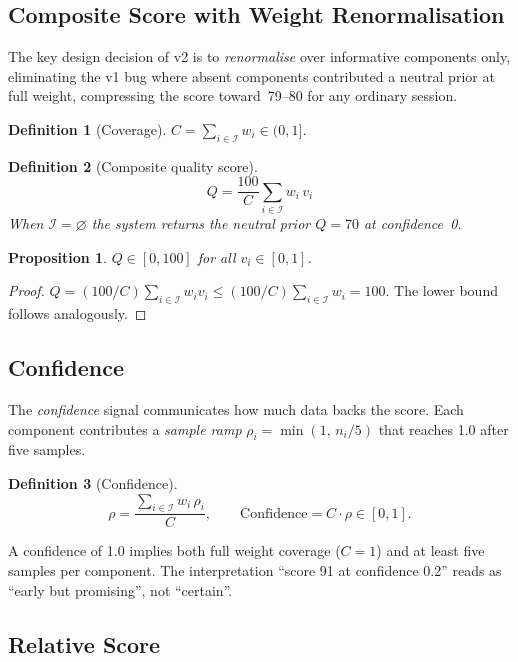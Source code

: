 \documentclass[11pt,a4paper]{article}
\newtheorem{definition}{Definition}
\newtheorem{proposition}{Proposition}
\newcommand{\calI}{\mathcal{I}}
\begin{document}
\subsection{Composite Score with Weight Renormalisation}
\label{sec:composite}

The key design decision of v2 is to \emph{renormalise} over informative
components only, eliminating the v1 bug where absent components contributed
a neutral prior at full weight, compressing the score toward~79--80 for
any ordinary session.

\begin{definition}[Coverage]
  $C = \sum_{i \in \calI} w_i \in (0, 1]$.
\end{definition}

\begin{definition}[Composite quality score]
\[
  \boxed{Q = \frac{100}{C} \sum_{i \in \calI} w_i\, v_i}
\]
When $\calI = \varnothing$ the system returns the neutral prior $Q = 70$
at confidence~0.
\end{definition}

\begin{proposition}
$Q \in [0, 100]$ for all $v_i \in [0,1]$.
\end{proposition}
\begin{proof}
  $Q = (100/C)\sum_{i \in \calI} w_i v_i \leq (100/C)\sum_{i \in \calI} w_i = 100$.
  The lower bound follows analogously.
\end{proof}

\subsection{Confidence}

The \emph{confidence} signal communicates how much data backs the score.
Each component contributes a \emph{sample ramp}
$\rho_i = \min(1,\, n_i/5)$ that reaches 1.0 after five samples.

\begin{definition}[Confidence]
\[
  \rho = \frac{\sum_{i \in \calI} w_i\,\rho_i}{C},
  \qquad
  \boxed{\text{Confidence} = C \cdot \rho \in [0,1].}
\]
\end{definition}

A confidence of 1.0 implies both full weight coverage ($C=1$) and at
least five samples per component.  The interpretation ``score 91 at
confidence 0.2'' reads as ``early but promising'', not ``certain''.

\subsection{Relative Score}
\end{document}

